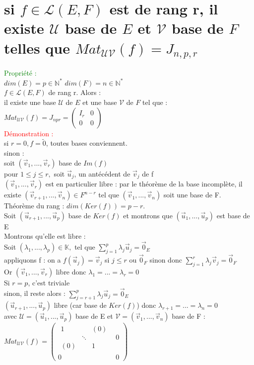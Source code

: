 \documentclass{article}
\begin{document}
        \section{si $f \in \mathcal L(E,F)$ est de rang r, il existe $\mathcal U$ base de $E$ et $\mathcal V$ base de $F$ telles que $Mat_{\mathcal{UV}}(f)=J_{n,p,r}$}
				\textcolor{green}{Propriété :} \\
				$dim(E)=p \in \mathbb N^*$ $dim(F)=n \in \mathbb N^*$ \\
				$f \in \mathcal L (E,F)$ de rang r. Alors : \\
				il existe une base $\mathcal U$ de $E$ et une base $\mathcal V$ de $F$ tel que :  $Mat_{\mathcal{UV}}(f)=J_{npr}=\left(\begin{array}{c|c}I _r& 0 \\ \hline0 & 0 \end{array}\right)$ \\
				\textcolor{red}{Démonstration :} \\
				si $r=0, f=\tilde{0}$, toutes bases conviennent. \\
				sinon : \\
				soit $(\vec v_1,..., \vec v_r)$ base de $Im(f)$ \\
				pour $1 \leq j \leq r, $ soit $\vec u_j$, un antécédent de $\vec v_j$ de f \\
				$(\vec v_1,..., \vec v_r)$ est en particulier libre : par le théorème de la base incomplète, il existe $(\vec v_{r+1},..., \vec v_n) \in F^{n-r}$ tel que $(\vec v_1,...,\vec v_n)$ soit une base de F. \\
				Théorème du rang : $dim(Ker(f))=p-r$. \\
				Soit $(\vec u_{r+1},..., \vec u_p)$ base de $Ker(f)$ et montrons que $(\vec u_1,..., \vec u_p)$ est base de E \\
				Montrons qu'elle est libre : \\
				Soit $(\lambda_1,...,\lambda_p) \in \mathbb K,$ tel que $\sum_{j=1}^p \lambda_j \vec u_j = \vec 0_E$ \\
				appliquons f : on a $f(\vec u_j)=\vec v_j$ si $j \leq r$ ou $\vec 0_F$ sinon donc $\sum_{j=1}^r \lambda_j \vec v_j=\vec 0_F$ \\
				Or $(\vec v_1,..., \vec v_r)$ libre donc $\lambda_1=...= \lambda_r=0$ \\
				Si $r=p$, c'est triviale \\
				sinon, il reste alors : $\sum_{j=r+1}^p \lambda_j \vec u_j= \vec 0_E$ \\
				$(\vec u_{r+1},...,\vec u_p)$ libre (car base de $Ker(f)$) donc $\lambda_{r+1}=...= \lambda_n= 0$ \\
				avec $\mathcal U= (\vec u_1,..., \vec u_p)$ base de E et $\mathcal V=(\vec v_1,..., \vec v_n)$ base de F : \\
				$Mat_{\mathcal{UV}}(f)=\left(\begin{array}{c|c}\begin{matrix}
				1 &  & (0) \\  & \ddots & \\ (0) & & 1
				\end{matrix} & 0 \\ \hline0 & 0 \end{array}\right)$
\end{document}

